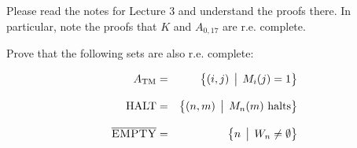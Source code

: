 \documentclass[12pt]{article}
\begin{document}
\noindent{}
\addtocounter{section}{3}

Please read the notes for Lecture 3 and understand the proofs there.  In particular, note the
proofs that $K$ and $A_{0,17}$ are r.e. complete.

Prove that the following sets are also r.e. complete:

\begin{eqnarray*}
A_{\text{TM}} &=& \bigl\{ (i,j) \,\bigm|\, M_i(j) = 1 \bigr\}\\[2ex]
\mbox{{\rm HALT}} &=& \bigl\{ (n,m) \,\bigm|\, M_n(m)\mbox{ halts} \bigr\}\\[2ex]
\overline{\mbox{{\rm\sc EMPTY}}} &=& \bigl\{ n \,\bigm|\, W_n \ne \emptyset \bigr\}
\end{eqnarray*}
\end{document}
